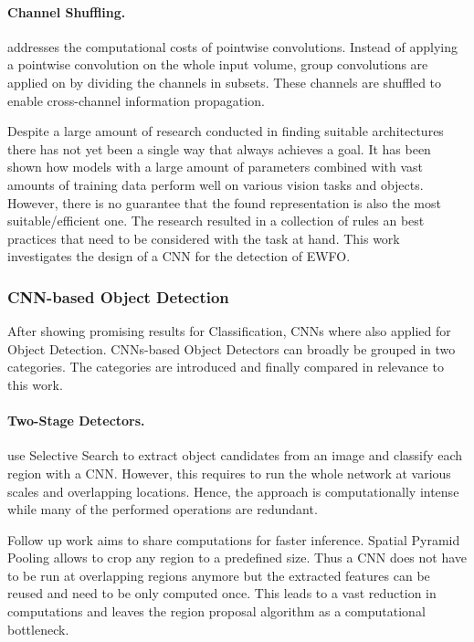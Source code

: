 \paragraph{Channel Shuffling.}

\cite{Zhang2017a} addresses the computational costs of pointwise convolutions. Instead of applying a pointwise convolution on the whole input volume, group convolutions are applied on by dividing the channels in subsets. These channels are shuffled to enable cross-channel information propagation. 

Despite a large amount of research conducted in finding suitable architectures there has not yet been a single way that always achieves a goal. It has been shown how models with a large amount of parameters combined with vast amounts of training data perform well on various vision tasks and objects. However, there is no guarantee that the found representation is also the most suitable/efficient one. The research resulted in a collection of rules an best practices that need to be considered with the task at hand. This work investigates the design of a \ac{CNN} for the detection of \ac{EWFO}.

\subsubsection{\ac{CNN}-based Object Detection}

After showing promising results for Classification, \acp{CNN} where also applied for Object Detection. \acp{CNN}-based Object Detectors can broadly be grouped in two categories. The categories are introduced and finally compared in relevance to this work.

\paragraph{Two-Stage Detectors.}

\citeauthor{Girshick2013} \cite{Girshick2013} use Selective Search \cite{Uijlings2013} to extract object candidates from an image and classify each region with a \ac{CNN}. However, this requires to run the whole network at various scales and overlapping locations. Hence, the approach is computationally intense while many of the performed operations are redundant.

Follow up work aims to share computations for faster inference. Spatial Pyramid Pooling \cite{He2014b} allows to crop any region to a predefined size. Thus a \ac{CNN} does not have to be run at overlapping regions anymore but the extracted features can be reused and need to be only computed once. This leads to a vast reduction in computations and leaves the region proposal algorithm as a computational bottleneck.

